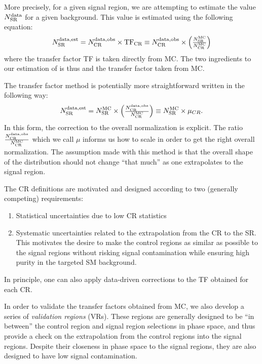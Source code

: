 More precisely, for a given signal region, we are attempting to estimate the value $\ntext{SR}{data}$ for a given background.
This value is estimated using the following equation:
\begin{align}\label{eq:bkg_est}
\ntext{SR}{data,est} = \ntext{CR}{data,obs} \times \text{TF}_{\text{CR}} \equiv \ntext{CR}{data,obs} \times  \begin{pmatrix} \frac{ \ntext{SR}{MC} }{ \ntext{CR}{MC} } \end{pmatrix}
\end{align}
where the transfer factor TF is taken directly from MC.
The two ingredients to our estimation of  is thus  and the transfer factor taken from MC.

The transfer factor method is potentially more straightforward written in the following way:
\begin{align}\label{eq:bkg_est_simple}
\ntext{SR}{data,est} = \ntext{SR}{MC} \times  \begin{pmatrix} \frac{\ntext{CR}{data,obs}  }{ \ntext{CR}{MC} } \end{pmatrix} \equiv \ntext{SR}{MC} \times \mu_{CR}.
\end{align}
In this form, the correction to the overall normalization is explicit.
The ratio $\frac{\ntext{CR}{data,obs}}{ \ntext{CR}{MC} }$ which we call $\mu$ informs us how to scale  in order to get the right overall normalization.
The assumption made with this method is that the overall shape of the distribution should not change ``that much'' as one extrapolates to the signal region.

The CR definitions are motivated and designed according to two (generally competing) requirements:
\begin{enumerate}
\item Statistical uncertainties due to low CR statistics
\item Systematic uncertainties related to the extrapolation from the CR to the SR.  This motivates the desire to make the control regions as similar as possible to the signal regions without risking signal contamination while ensuring high purity in the targeted SM background.
\end{enumerate}
In principle, one can also apply data-driven corrections to the TF obtained for each CR.

In order to validate the transfer factors obtained from MC, we also develop a series of \textit{validation regions} (VRs).
These regions are generally designed to be ``in between'' the control region and signal region selections in phase space, and thus provide a check on the extrapolation from the control regions into the signal regions.
Despite their closeness in phase space to the signal regions, they are also designed to have low signal contamination.

